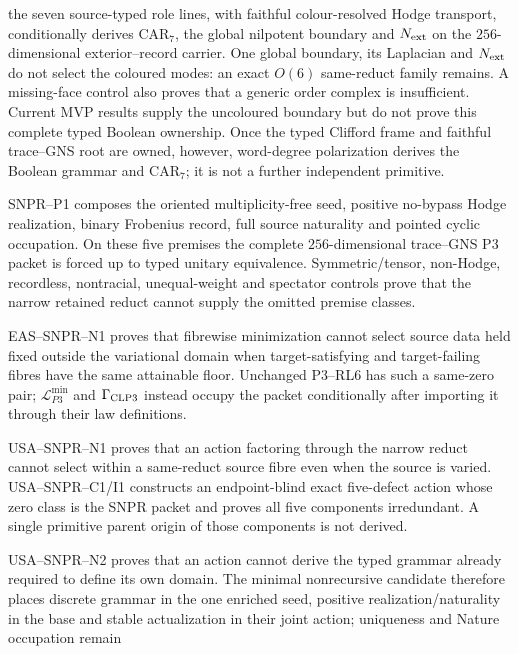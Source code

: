 \documentclass[11pt,a4paper]{article}
\theoremstyle{remark}
\begin{document}
\begin{description}
 the seven source-typed role lines, with faithful colour-resolved Hodge
 transport, conditionally derives CAR$_7$, the global nilpotent boundary and
 $N_{\rm ext}$ on the $256$-dimensional exterior--record carrier.  One global
 boundary, its Laplacian and $N_{\rm ext}$ do not select the coloured modes:
 an exact $O(6)$ same-reduct family remains.  A missing-face control also
 proves that a generic order complex is insufficient.  Current MVP results
 supply the uncoloured boundary but do not prove this complete typed Boolean
 ownership.  Once the typed Clifford frame and faithful trace--GNS root are
 owned, however, word-degree polarization derives the Boolean grammar and
 CAR$_7$; it is not a further independent primitive.
 \item[Source-natural pointed composition.] SNPR--P1 composes the oriented
 multiplicity-free seed, positive no-bypass Hodge realization, binary
 Frobenius record, full source naturality and pointed cyclic occupation.  On
 these five premises the complete $256$-dimensional trace--GNS P3 packet is
 forced up to typed unitary equivalence.  Symmetric/tensor, non-Hodge,
 recordless, nontracial, unequal-weight and spectator controls prove that the
 narrow retained reduct cannot supply the omitted premise classes.
 \item[Existing-action boundary.] EAS--SNPR--N1 proves that fibrewise
 minimization cannot select source data held fixed outside the variational
 domain when target-satisfying and target-failing fibres have the same
 attainable floor.  Unchanged P3--RL6 has such a same-zero pair;
 $\mathcal L_{P3}^{\min}$ and $\Gamma_{\rm CLP3}$ instead occupy the packet
 conditionally after importing it through their law definitions.
 \item[Source-varying joint action.] USA--SNPR--N1 proves that an action
 factoring through the narrow reduct cannot select within a same-reduct
 source fibre even when the source is varied.  USA--SNPR--C1/I1 constructs an
 endpoint-blind exact five-defect action whose zero class is the SNPR packet
 and proves all five components irredundant.  A single primitive parent origin
 of those components is not derived.
 \item[Source-language boundary.] USA--SNPR--N2 proves that an action cannot
 derive the typed grammar already required to define its own domain.  The
 minimal nonrecursive candidate therefore places discrete grammar in the one
 enriched seed, positive realization/naturality in the base and stable
 actualization in their joint action; uniqueness and Nature occupation remain

\end{description}
\end{document}
